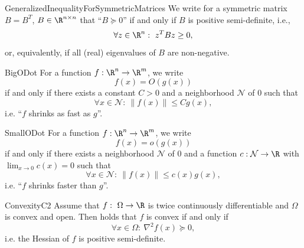 \begin{theo}{GeneralizedInequalityForSymmetricMatrices}
    We write for a symmetric matrix $B = B^T$, $B \in \R^{n \times n}$ that ``$B \succeq 0$'' if and only if $B$ is positive semi-definite, i\@.e\@., 
    \begin{equation*}
        \forall z \in \R^n: \ z^T B z \geq 0,
    \end{equation*}
    or, equivalently, if all (real) eigenvalues of $B$ are non-negative.
\end{theo}

\begin{theo}[$O(\cdot)$]{BigODot}
    For a function $f: \R^n \rightarrow \R^m$, we write 
    \begin{equation*}
        f(x) = O(g(x))
    \end{equation*} 
    if and only if there exists a constant $C > 0$ and a neighborhood $\mathcal{N}$ of $0$ such that 
    \begin{equation*}
        \forall x \in \mathcal{N}: \ \| f(x) \| \leq C g(x),
    \end{equation*} 
    i\@.e\@. ``$f$ shrinks as fast as $g$''.
\end{theo}

\begin{theo}[$o(\cdot)$]{SmallODot}
    For a function $f: \R^n \rightarrow \R^m$, we write 
    \begin{equation*}
        f(x) = o(g(x))
    \end{equation*} 
    if and only if there exists a neighborhood $\mathcal{N}$ of $0$ and a function $c: \mathcal{N} \rightarrow \R$ with $\lim_{x \rightarrow 0} c(x) = 0$ such that 
    \begin{equation*}
        \forall x \in \mathcal{N}: \ \| f(x) \| \leq c(x) g(x),
    \end{equation*} 
    i\@.e\@. ``$f$ shrinks faster than $g$''.
\end{theo}

\begin{theo}{ConvexityC2}
    Assume that $f: \ \Omega \rightarrow \R$ is twice continuously differentiable and $\Omega$ is convex and open. Then holds that $f$ is convex if and only if
    \begin{equation*}
        \forall x \in \Omega: \ \nabla^2 f(x) \succeq 0,
    \end{equation*}
    i\@.e\@. the Hessian of $f$ is positive semi-definite.
\end{theo}


